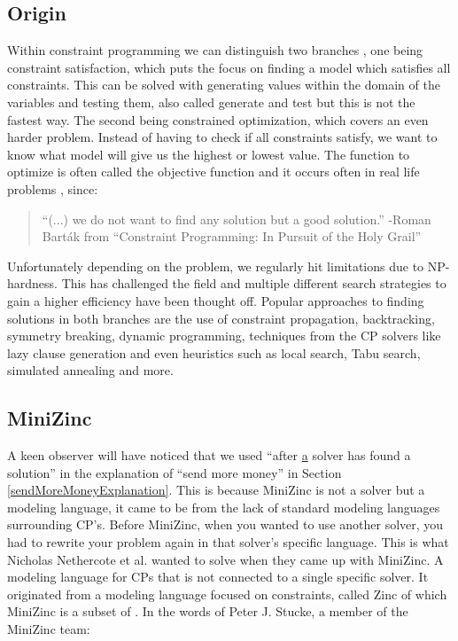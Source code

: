 \subsection{Origin}
Within constraint programming we can distinguish two branches \cite{52bartak1999constraint}, one being constraint satisfaction, which puts the focus on finding a model which satisfies all constraints. This can be solved with generating values within the domain of the variables and testing them, also called generate and test but this is not the fastest way. 
The second being constrained optimization, which covers an even harder problem. Instead of having to check if all constraints satisfy, we want to know what model will give us the highest or lowest value. The function to optimize is often called the objective function and it occurs often in real life problems \cite{52bartak1999constraint}, since:
\begin{quote}
	 “(...) we do not want to find any solution but a good solution.” \newline
	 -Roman Bart\'ak from “Constraint Programming: In Pursuit of the Holy Grail” \cite{52bartak1999constraint}
\end{quote}
Unfortunately depending on the problem, we regularly hit limitations due to NP-hardness. This has challenged the field and multiple different search strategies to gain a higher efficiency have been thought off. Popular approaches to finding solutions in both branches are the use of constraint propagation, backtracking, symmetry breaking, dynamic programming, techniques from the CP solvers like lazy clause generation and even heuristics such as local search, Tabu search, simulated annealing and more. 

\subsection{MiniZinc}
A keen observer will have noticed that we used “after \underline{a} solver has found a solution” in the explanation of “send more money” in Section \ref{sendMoreMoneyExplanation}. 
This is because MiniZinc is not a solver but a modeling language, it came to be from the lack of standard modeling languages surrounding CP’s. Before MiniZinc, when you wanted to use another solver, you had to rewrite your problem again in that solver’s specific language. This is what Nicholas Nethercote et al. \cite{57nethercote2007minizinc} wanted to solve when they came up with MiniZinc. A modeling language for CPs that is not connected to a single specific solver. It originated from a modeling language focused on constraints, called Zinc \cite{68incbanda2006modelling} of which MiniZinc is a subset of \cite{57nethercote2007minizinc}.
In the words of Peter J. Stucke, a member of the MiniZinc team:

